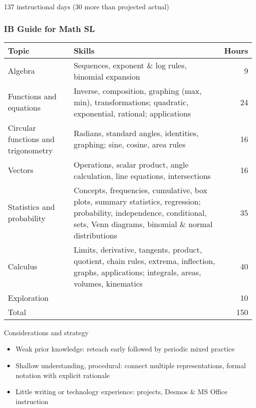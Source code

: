 137 instructional days (30 more than projected actual)


\newpage
\subsubsection*{IB Guide for Math SL}

\begin{tabular}{|p{6cm}|p{12cm}|r|}
  \hline
  Topic & Skills & Hours \\
  \hline
  Algebra &Sequences, exponent \& log rules, binomial expansion& 9 \\
  \hline
  Functions and equations &Inverse, composition, graphing (max, min), transformations; quadratic, exponential, rational; applications & 24 \\
  \hline
  Circular functions and trigonometry & Radians, standard angles, identities, graphing; sine, cosine, area rules & 16 \\
  \hline
  Vectors & Operations, scalar product, angle calculation, line equations, intersections & 16 \\
  \hline
  Statistics and probability &Concepts, frequencies, cumulative, box plots, summary statistics, regression; probability, independence, conditional, sets, Venn diagrams, binomial \& normal distributions & 35 \\
  \hline
  Calculus &Limits, derivative, tangents, product, quotient, chain rules, extrema, inflection, graphs, applications; integrals, areas, volumes, kinematics& 40 \\
  \hline
  Exploration && 10 \\
  \hline
  Total && 150 \\
  \hline
\end{tabular}

  \vspace{1cm}

Considerations and strategy
\begin{itemize}
  \item Weak prior knowledge: reteach early followed by periodic mixed practice
  \item Shallow understanding, procedural: connect multiple representations, formal notation with explicit rationale
  \item Little writing or technology experience: projects, Desmos \& MS Office instruction
\end{itemize}

